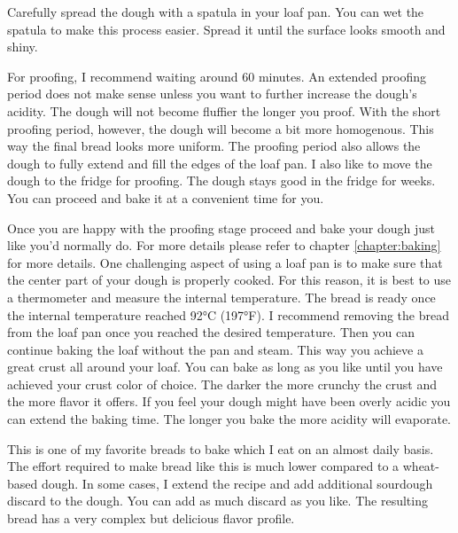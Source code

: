 Carefully spread the dough with a spatula in your loaf pan. You
can wet the spatula to make this process easier. Spread it
until the surface looks smooth and shiny.

For proofing, I recommend waiting around 60 minutes. An extended
proofing period does not make sense unless you want to further
increase the dough's acidity. The dough will not become fluffier
the longer you proof. With the short proofing period, however,
the dough will become a bit more homogenous. This way the final
bread looks more uniform. The proofing period also allows the
dough to fully extend and fill the edges of the loaf pan. I also
like to move the dough to the fridge for proofing. The dough stays
good in the fridge for weeks. You can proceed and bake it at a
convenient time for you. 

Once you are happy with the proofing stage proceed and bake your dough
just like you'd normally do. For more details please refer to chapter
\ref{chapter:baking} for more details. One challenging aspect
of using a loaf pan is to make sure that the center part of your
dough is properly cooked. For this reason, it is best to use a thermometer
and measure the internal temperature. The bread is
ready once the internal temperature reached 92°C (197°F). I recommend
removing the bread from the loaf pan once you reached the desired
temperature. Then you can continue baking the loaf without the pan and
steam. This way you achieve a great crust all around your
loaf. You can bake as long as you like until you have achieved
your crust color of choice. The darker the more crunchy
the crust and the more flavor it offers. If you feel your
dough might have been overly acidic you can extend the baking time.
The longer you bake the more acidity will evaporate.

This is one of my favorite breads to bake which I eat on an
almost daily basis. The effort required to make bread like
this is much lower compared to a wheat-based dough. In some
cases, I extend the recipe and add additional sourdough discard
to the dough. You can add as much discard as you like. The resulting
bread has a very complex but delicious flavor profile.